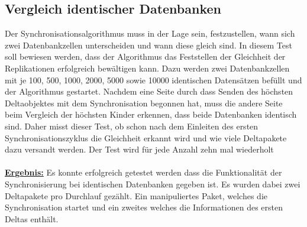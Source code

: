 \documentclass[a4paper,11pt,oneside,%
headsepline,												%
footsepline,												%
bibtotocnumbered									%
]{scrreprt}
\begin{document}
\subsection{Vergleich identischer Datenbanken}
Der Synchronisationsalgorithmus muss in der Lage sein, festzustellen, wann sich zwei Datenbankzellen unterscheiden und wann diese gleich sind. In diesem Test soll bewiesen werden, dass der Algorithmus das Feststellen der Gleichheit der Replikationen erfolgreich bewältigen kann. Dazu werden zwei Datenbankzellen mit je 100, 500, 1000, 2000, 5000 sowie 10000 identischen Datensätzen befüllt und der Algorithmus gestartet. Nachdem eine Seite durch dass Senden des höchsten Deltaobjektes mit dem Synchronisation begonnen hat, muss die andere Seite beim Vergleich der höchsten Kinder erkennen, dass beide Datenbanken identisch sind. Daher misst dieser Test, ob schon nach dem Einleiten des ersten Synchronisationszyklus die Gleichheit erkannt wird und wie viele Deltapakete dazu versandt werden. Der Test wird für jede Anzahl zehn mal wiederholt\\\\
\underline{{\bf Ergebnis:}} Es konnte erfolgreich getestet werden dass die Funktionalität der Synchronisierung bei identischen Datenbanken gegeben ist. Es wurden dabei zwei Deltapakete pro Durchlauf gezählt. Ein manipuliertes Paket, welches die Synchronisation startet und ein zweites welches die Informationen des ersten Deltas enthält.
\end{document}
